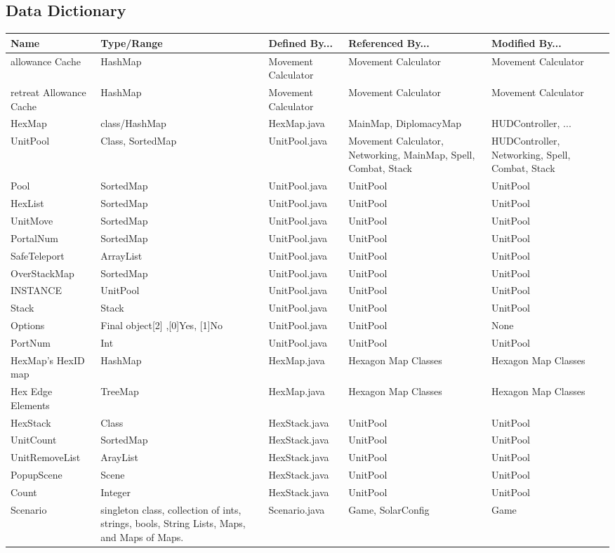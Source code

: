 \documentclass[12pt,a4paper,titlepage]{article}
\begin{document}
\subsection{Data Dictionary}
\small{
\begin{center}
\keepXColumns
\noindent\begin{tabularx}{\linewidth}{|l|X|X|X|X|}\hline
\textbf{Name} & \textbf{Type/Range} & \textbf{Defined By...} & \textbf{Referenced By...} & \textbf{Modified By...}\\
\hline
allowance Cache & HashMap & Movement Calculator & Movement Calculator & Movement Calculator\\
\hline
retreat Allowance Cache & HashMap & Movement Calculator & Movement Calculator & Movement Calculator\\
\hline
HexMap & class/HashMap & HexMap.java & MainMap, DiplomacyMap & HUDController, ...\\
\hline
UnitPool & Class, SortedMap & UnitPool.java & Movement Calculator, Networking, MainMap, Spell, Combat, Stack & HUDController, Networking, Spell, Combat, Stack\\
\hline
Pool & SortedMap & UnitPool.java & UnitPool & UnitPool\\
\hline
HexList & SortedMap & UnitPool.java & UnitPool & UnitPool\\
\hline
UnitMove & SortedMap & UnitPool.java & UnitPool & UnitPool\\
\hline
PortalNum & SortedMap & UnitPool.java & UnitPool & UnitPool\\
\hline
SafeTeleport & ArrayList & UnitPool.java & UnitPool & UnitPool\\
\hline
OverStackMap & SortedMap & UnitPool.java & UnitPool & UnitPool\\
\hline
INSTANCE & UnitPool & UnitPool.java & UnitPool & UnitPool\\
\hline
Stack & Stack & UnitPool.java & UnitPool & UnitPool\\
\hline
Options & Final object[2] ,[0]Yes, [1]No & UnitPool.java & UnitPool & None\\
\hline
PortNum & Int & UnitPool.java & UnitPool & UnitPool\\
\hline
HexMap's HexID map & HashMap & HexMap.java & Hexagon Map Classes & Hexagon Map Classes\\
\hline
Hex Edge Elements & TreeMap & HexMap.java & Hexagon Map Classes & Hexagon Map Classes\\
\hline
HexStack & Class & HexStack.java & UnitPool & UnitPool\\
\hline
UnitCount & SortedMap & HexStack.java & UnitPool & UnitPool\\
\hline
UnitRemoveList & ArayList & HexStack.java & UnitPool & UnitPool\\
\hline
PopupScene & Scene & HexStack.java & UnitPool & UnitPool\\
\hline
Count & Integer & HexStack.java & UnitPool & UnitPool\\
\hline
Scenario & singleton class, collection of ints, strings, bools, String Lists, Maps, and Maps of Maps. & Scenario.java & Game, SolarConfig & Game\\
\hline
\end{tabularx}
\end{center}
}
	
\end{document}
